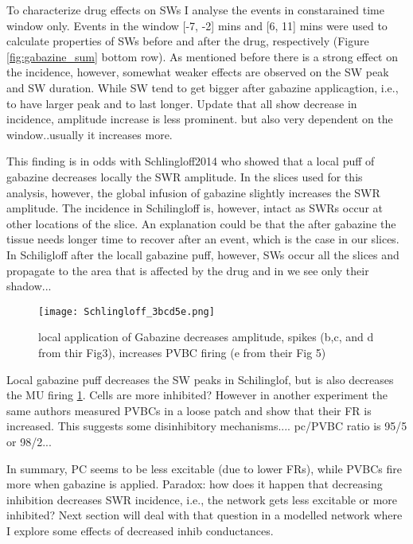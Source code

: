     To characterize drug effects on SWs I analyse the events in constarained
    time window only. Events in the window [-7, -2] mins and [6, 11] mins
    were used to calculate properties of SWs before and after the drug,
    respectively (Figure \ref{fig:gabazine_sum} bottom row). As mentioned
    before there is a strong effect on the incidence, however, somewhat weaker
    effects are observed on the SW peak and SW duration. While SW tend to get
    bigger after gabazine applicagtion, i.e., to have larger peak and to last
    longer. Update that all show decrease in incidence, amplitude increase is
    less prominent. but also very dependent on the window..usually it increases
    more.

    This finding is in odds with Schlingloff2014 who showed that a local puff
    of gabazine decreases locally the SWR amplitude.  In the slices used for
    this analysis, however, the global infusion of gabazine slightly increases
    the SWR amplitude.  The incidence in Schilingloff is, however, intact as
    SWRs occur at other locations of the slice.  An explanation could be that
    the after gabazine the tissue needs longer time to recover after an event,
    which is the case in our slices. In Schiligloff after the locall gabazine
    puff, however, SWs occur all the slices and propagate to the area that is
    affected by the drug and in we see only their shadow...

    \begin{figure}
      \texttt{[image: Schlingloff\_3bcd5e.png]}
      \caption{local application of Gabazine decreases amplitude, spikes (b,c,
        and d from thir Fig3), increases PVBC firing (e from their Fig 5)
            }
      \label{fig:schlingloff_gabazine}
    \end{figure}

    Local gabazine puff decreases the SW peaks in Schilinglof, but is also
    decreases the MU firing \ref{fig:schlingloff_gabazine}. Cells are more
    inhibited? However in another experiment the same authors measured PVBCs in
    a loose patch and show that their FR is increased. This suggests some
    disinhibitory mechanisms.... pc/PVBC ratio is 95/5 or 98/2...
    
    In summary, PC seems to be less excitable (due to lower FRs), while PVBCs
    fire more when gabazine is applied. Paradox: how does it happen that
    decreasing inhibition decreases SWR incidence, i.e., the network gets less
    excitable or more inhibited?  Next section will deal with that question in
    a modelled network where I explore some effects of decreased inhib
    conductances.

